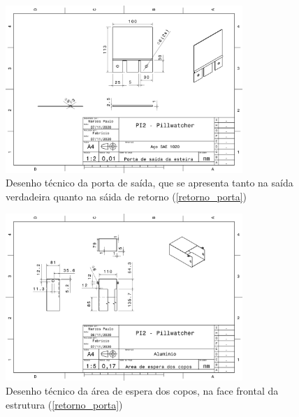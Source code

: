 \begin{apendicesenv}
\begin{figure}[H]
    \centering
    \includegraphics[width=0.8\textwidth]{figuras/estrutura/Desenhos/Porta_Saida.pdf}
    \caption{Desenho técnico da porta de saída, que se apresenta tanto na saída verdadeira quanto na sáida de retorno (\ref{retorno_porta})}
    \label{fig:porta_saida}
\end{figure}

\begin{figure}[H]
    \centering
    \includegraphics[width=0.8\textwidth]{figuras/estrutura/Desenhos/Area de espera dos copos.pdf}
    \caption{Desenho técnico da área de espera dos copos, na face frontal da estrutura (\ref{retorno_porta})}
    \label{fig:area_espera}
\end{figure}


\end{apendicesenv}
